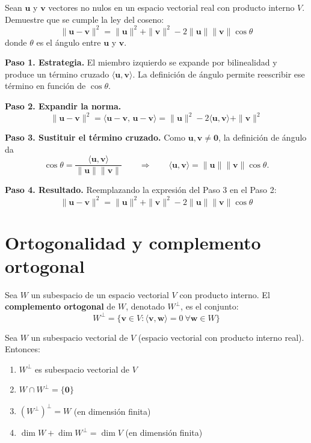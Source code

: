 \begin{example}
Sean $\mathbf{u}$ y $\mathbf{v}$ vectores no nulos en un espacio vectorial real con producto interno $V$. Demuestre que se cumple la ley del coseno:
\[
\|\mathbf{u}-\mathbf{v}\|^2 = \|\mathbf{u}\|^2 + \|\mathbf{v}\|^2 - 2\|\mathbf{u}\|\|\mathbf{v}\|\cos\theta
\]
donde $\theta$ es el ángulo entre $\mathbf{u}$ y $\mathbf{v}$.
\begin{myproof}
\textbf{Paso 1. Estrategia.} El miembro izquierdo se expande por bilinealidad y produce un término cruzado $\langle \mathbf{u}, \mathbf{v} \rangle$. La definición de ángulo permite reescribir ese término en función de $\cos\theta$.

\textbf{Paso 2. Expandir la norma.}
\[
\|\mathbf{u} - \mathbf{v}\|^2 = \langle \mathbf{u}-\mathbf{v},\, \mathbf{u}-\mathbf{v} \rangle = \|\mathbf{u}\|^2 - 2\langle \mathbf{u}, \mathbf{v} \rangle + \|\mathbf{v}\|^2
\]

\textbf{Paso 3. Sustituir el término cruzado.} Como $\mathbf{u}, \mathbf{v} \neq \mathbf{0}$, la definición de ángulo da
\[
\cos \theta = \frac{\langle \mathbf{u}, \mathbf{v} \rangle}{\|\mathbf{u}\|\|\mathbf{v}\|} \qquad\Longrightarrow\qquad \langle \mathbf{u}, \mathbf{v} \rangle = \|\mathbf{u}\|\|\mathbf{v}\|\cos\theta.
\]

\textbf{Paso 4. Resultado.} Reemplazando la expresión del Paso 3 en el Paso 2:
\[
\boxed{\|\mathbf{u} - \mathbf{v}\|^2 = \|\mathbf{u}\|^2 + \|\mathbf{v}\|^2 - 2\|\mathbf{u}\|\|\mathbf{v}\|\cos\theta}
\]
\end{myproof}
\end{example}


\section{Ortogonalidad y complemento ortogonal}

\begin{definition}
Sea $W$ un subespacio de un espacio vectorial $V$ con producto interno. El \textbf{complemento ortogonal} de $W$, denotado $W^\perp$, es el conjunto:
\[
W^\perp = \{ \mathbf{v} \in V : \langle \mathbf{v}, \mathbf{w} \rangle = 0 \ \forall \mathbf{w} \in W \}
\]
\end{definition}

\begin{theorem}
Sea $W$ un subespacio vectorial de $V$ (espacio vectorial con producto interno real). Entonces:
\begin{enumerate}
    \item $W^\perp$ es subespacio vectorial de $V$
    \item $W \cap W^\perp = \{ \mathbf{0} \}$
    \item $(W^\perp)^\perp = W$ (en dimensión finita)
    \item $\dim W + \dim W^\perp = \dim V$ (en dimensión finita)
\end{enumerate}
\end{theorem}

